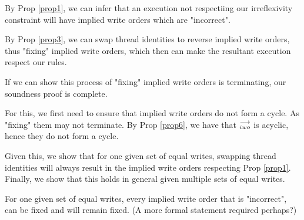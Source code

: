         By Prop \ref{prop1}, we can infer that an execution not respectiing our irreflexivity constraint will have implied write orders which are "incorrect". 

        
        By Prop \ref{prop3}, we can swap thread identities to reverse implied write orders, thus "fixing" implied write orders, which then can make the resultant execution respect our rules. 

        If we can show this process of "fixing" implied write orders is terminating, our soundness proof is complete. 

        For this, we first need to ensure that implied write orders do not form a cycle. As "fixing" them may not terminate.  By Prop \ref{prop6}, we have that $\stackrel{\longrightarrow}{_{iwo}}$ is acyclic, hence they do not form a cycle.  
        
        Given this, we show that for one given set of equal writes, swapping thread identities will always result in the implied write orders respecting Prop \ref{prop1}. 
        Finally, we show that this holds in general given multiple sets of equal writes.  


        \begin{lemma}
            For one given set of equal writes, every implied write order that is "incorrect", can be fixed and will remain fixed.  
            (A more formal statement required perhaps?)
        \end{lemma}
            
